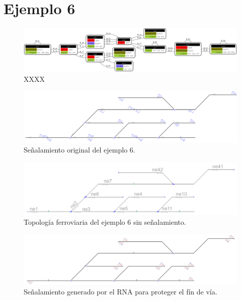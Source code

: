 \section{Ejemplo 6}

    \lipsum[1]
    
    \begin{figure}[h]
    	\centering
    	\includegraphics[width=1\textwidth]{Figuras/Graph_6}
    	\centering\caption{XXXX}
    \end{figure}
    
    \lipsum[1]

    \begin{figure}[h]
        \centering
        \includegraphics[width=1\textwidth]{resultados-obtenidos/ejemplo6/images/6_original.png}
        \centering\caption{Señalamiento original del ejemplo 6.}
    \end{figure}

    \begin{figure}[h]
        \centering
        \includegraphics[width=1\textwidth]{resultados-obtenidos/ejemplo6/images/6_empty.png}
        \centering\caption{Topología ferroviaria del ejemplo 6 sin señalamiento.}
    \end{figure}

    \begin{figure}[h]
        \centering
        \includegraphics[width=1\textwidth]{resultados-obtenidos/ejemplo6/images/6_step1.png}
        \centering\caption{Señalamiento generado por el RNA para proteger el fín de vía.}
    \end{figure}

